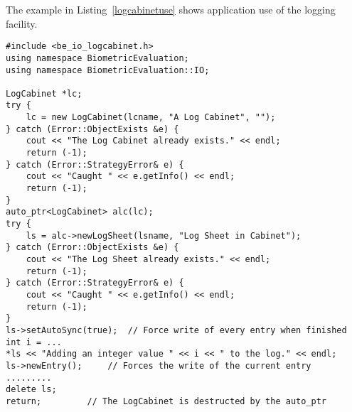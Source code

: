 The example in Listing~\ref{logcabinetuse} shows application use of the
logging facility.

\lstset{language=c++}
\begin{lstlisting}[caption={Using a LogSheet within a LogCabinet}, label=logcabinetuse]
#include <be_io_logcabinet.h>
using namespace BiometricEvaluation;
using namespace BiometricEvaluation::IO;

LogCabinet *lc;
try {
    lc = new LogCabinet(lcname, "A Log Cabinet", "");
} catch (Error::ObjectExists &e) {
    cout << "The Log Cabinet already exists." << endl;
    return (-1);
} catch (Error::StrategyError& e) {
    cout << "Caught " << e.getInfo() << endl;
    return (-1);
}
auto_ptr<LogCabinet> alc(lc);
try {
    ls = alc->newLogSheet(lsname, "Log Sheet in Cabinet");
} catch (Error::ObjectExists &e) {
    cout << "The Log Sheet already exists." << endl;
    return (-1);
} catch (Error::StrategyError& e) {
    cout << "Caught " << e.getInfo() << endl;
    return (-1);
}
ls->setAutoSync(true);	// Force write of every entry when finished
int i = ...
*ls << "Adding an integer value " << i << " to the log." << endl;
ls->newEntry();		// Forces the write of the current entry
.........
delete ls;
return;			// The LogCabinet is destructed by the auto_ptr
\end{lstlisting}

